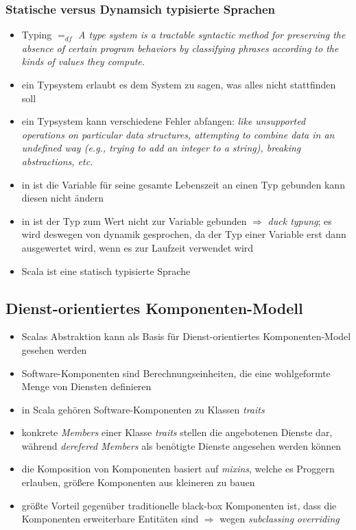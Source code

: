 \subsubsection{Statische versus Dynamsich typisierte Sprachen}
\begin{itemize}
  \item Typing $=_{df}$ \textit{A type system is a tractable syntactic method for preserving the absence of certain
program behaviors by classifying phrases according to the kinds of values they
compute.}

  \item ein Typsystem erlaubt es dem System zu sagen, was alles nicht
  stattfinden soll
  \item ein Typsystem kann verschiedene Fehler abfangen: \textit{like unsupported
operations on particular data structures, attempting to combine data in an undefined
way (e.g., trying to add an integer to a string), breaking abstractions, etc.
}
  \item in  ist die Variable für seine gesamte Lebenszeit an einen Typ gebunden \und kann diesen nicht ändern
  \item in  ist der Typ zum Wert \und 
  nicht zur Variable gebunden $\Rightarrow$ \textit{duck typung}; es wird
  deswegen von dynamik gesprochen, da der Typ einer Variable erst dann
  ausgewertet wird, wenn es zur Laufzeit verwendet wird
  \item Scala ist eine statisch typisierte Sprache
\end{itemize}



\subsection{Dienst-orientiertes Komponenten-Modell}

\begin{itemize}
  \item Scalas Abstraktion kann als Basis für Dienst-orientiertes 
  Komponenten-Model gesehen werden
  \item Software-Komponenten sind Berechnungseinheiten, die eine wohlgeformte
  Menge von Diensten definieren
  \item in Scala gehören Software-Komponenten zu Klassen \und \textit{traits}
  \item konkrete \textit{Members} einer Klasse \oder \textit{traits} stellen
  die angebotenen Dienste dar, während \textit{derefered Members} als
  benötigte Dienste angesehen werden können
  \item die Komposition von Komponenten basiert auf \textit{mixins}, welche
  es Proggern erlauben, größere Komponenten aus kleineren zu bauen
  \item größte Vorteil gegenüber traditionelle black-box Komponenten ist,
  dass die Komponenten erweiterbare Entitäten sind $\Rightarrow$ wegen
  \textit{subclassing} \und \textit{overriding}
\end{itemize}

